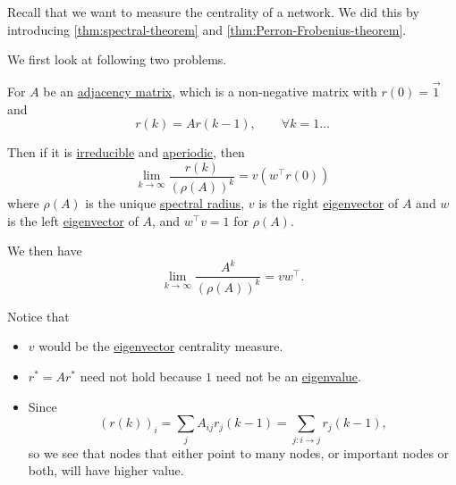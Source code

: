 Recall that we want to measure the centrality of a network. We did this by introducing \autoref{thm:spectral-theorem} and
\autoref{thm:Perron-Frobenius-theorem}.

We first look at following two problems.
\begin{problem}
For \(A\) be an \hyperref[def:adjacency-matrix]{adjacency matrix}, which is a non-negative matrix with \(r(0) = \vec{1}\) and
\[
	r(k) = Ar(k - 1), \qquad \forall k = 1\ldots
\]

Then if it is \hyperref[def:irreducible]{irreducible} and \hyperref[def:aperiodic]{aperiodic}, then
\[
	\lim_{k\to \infty } \frac{r(k)}{(\rho(A))^k} = v(w^{\top} r(0))
\]
where \(\rho(A)\) is the unique \hyperref[def:spectral-radius]{spectral radius}, \(v\) is the right \hyperref[def:eigenvector]{eigenvector} of
\(A\) and \(w\) is the left \hyperref[def:eigenvector]{eigenvector} of \(A\), and \(w^{\top}v = 1\) for \(\rho(A)\).

We then have
\[
	\lim_{k\to \infty}\frac{A^k}{(\rho(A))^k} = vw^{\top}.
\]

\begin{remark}
	Notice that
	\begin{itemize}
		\item \(v\) would be the \hyperref[def:eigenvector]{eigenvector} centrality measure.
		\item \(r^{\ast} = A r^{\ast}\) need not hold because \(1\) need not be an \hyperref[def:eigenvalue]{eigenvalue}.
		\item Since
		      \[
			      (r(k))_i = \sum\limits_{j} A_{ij}r_{j}(k - 1) = \sum\limits_{j\colon i\to j} r_j(k-1),
		      \]
		      so we see that nodes that either point to many nodes, or important nodes or both, will have higher value.
	\end{itemize}
\end{remark}
\end{problem}

